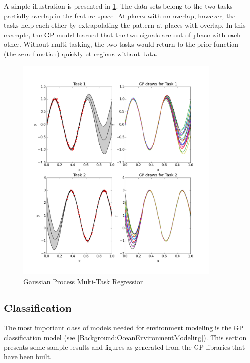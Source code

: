 				A simple illustration is presented in \cref{ProgressReport:GaussianProcessModels:Figure:multitask}. The data sets belong to the two tasks partially overlap in the feature space. At places with no overlap, however, the tasks help each other by extrapolating the pattern at places with overlap. In this example, the GP model learned that the two signals are out of phase with each other. Without multi-tasking, the two tasks would return to the prior function (the zero function) quickly at regions without data.
				
				\begin{figure}[!htbp]
					\centering
						\includegraphics[width=0.9\textwidth]{Figures/Progress/multitask.png}
					\caption{Gaussian Process Multi-Task Regression}
					\label{ProgressReport:GaussianProcessModels:Figure:multitask}
				\end{figure}
							
				\FloatBarrier
			
		\subsection{Classification}
		
			The most important class of models needed for environment modeling is the GP classification model (see \cref{Background:OceanEnvironmentModeling}). This section presents some sample results and figures as generated from the GP libraries that have been built.
			
